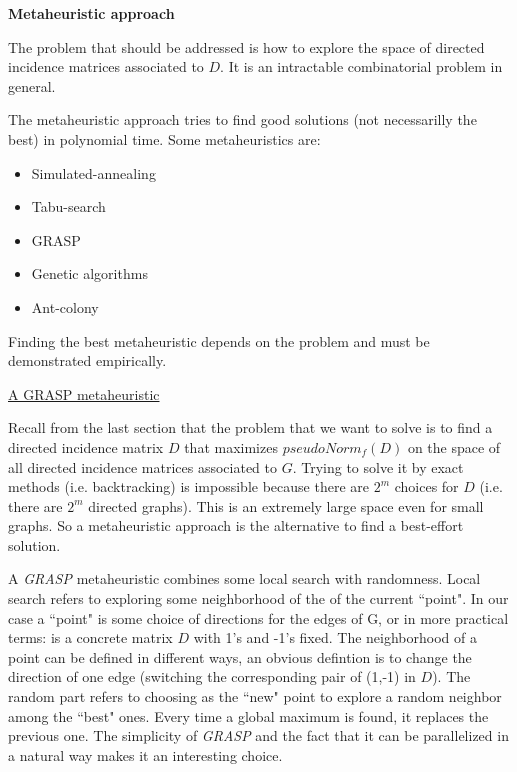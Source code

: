 \documentclass[a4paper,11pt]{article}
\begin{document}
\bigskip

\textbf{Metaheuristic approach}

\bigskip

The problem that should be addressed is how to explore the space of 
directed incidence matrices associated to $D$. It is an intractable 
combinatorial problem in general. 

\bigskip

The metaheuristic approach tries to find good solutions (not 
necessarilly the best) in polynomial time. Some metaheuristics are:

\begin{itemize}
	\item Simulated-annealing
	\item Tabu-search
	\item GRASP
	\item Genetic algorithms
	\item Ant-colony
\end{itemize}

Finding the best metaheuristic depends on the problem and must be 
demonstrated empirically.

\bigskip

\underline{A GRASP metaheuristic}

\bigskip

Recall from the last section that the problem that we want to solve is 
to find a directed incidence matrix $D$ that maximizes $pseudoNorm_f(D)$ 
on the space of all directed incidence matrices associated to $G$. 
Trying to solve it by exact methods (i.e. backtracking) is impossible 
because there are $2^m$ choices for $D$ (i.e. there are $2^m$ directed 
graphs). This is an extremely large space even for small graphs. So a 
metaheuristic approach is the alternative to find a best-effort 
solution.

\bigskip

A \textit{GRASP} metaheuristic combines some local search 
with randomness. Local search refers to exploring some neighborhood of 
the of the current ``point". In our case a ``point" is some choice of 
directions for the edges of G, or in more practical terms: is a 
concrete matrix $D$ with 1's and -1's fixed. The neighborhood of a 
point can be defined in different ways, an obvious defintion is to 
change the direction of one edge (switching the corresponding pair of 
(1,-1) in $D$). The random part refers to choosing as the ``new" point 
to explore a random neighbor among the ``best" ones. Every time a global 
maximum is found, it replaces the previous one. The simplicity of 
\textit{GRASP} and the fact that it can be parallelized in a natural 
way makes it an interesting choice.
\end{document}
